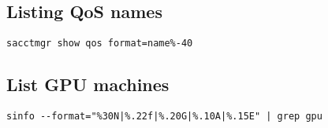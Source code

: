 \subsection{Listing QoS names}
\verb|sacctmgr show qos format=name%-40|

\subsection{List GPU machines}
\verb!sinfo --format="%30N|%.22f|%.20G|%.10A|%.15E" | grep gpu!
